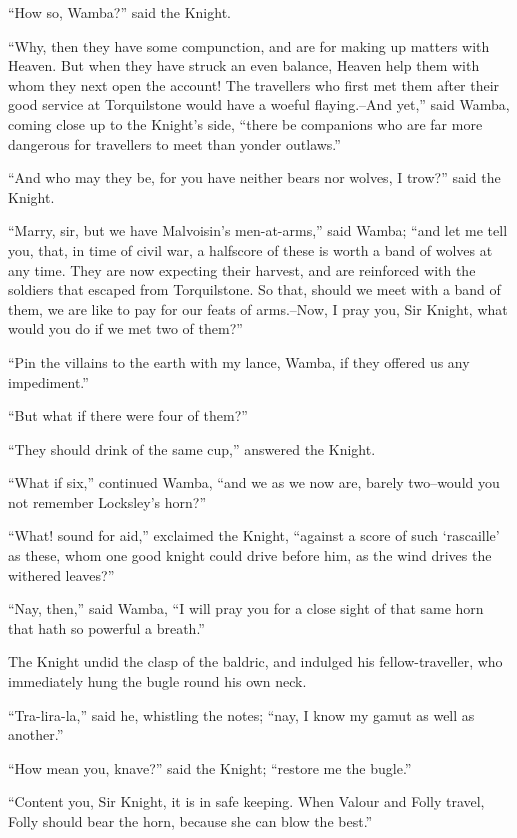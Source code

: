 ``How so, Wamba?'' said the Knight.

``Why, then they have some compunction, and are for making up matters
with Heaven. But when they have struck an even balance, Heaven help them
with whom they next open the account! The travellers who first met them
after their good service at Torquilstone would have a woeful
flaying.--And yet,'' said Wamba, coming close up to the Knight's side,
``there be companions who are far more dangerous for travellers to meet
than yonder outlaws.''

``And who may they be, for you have neither bears nor wolves, I trow?''
said the Knight.

``Marry, sir, but we have Malvoisin's men-at-arms,'' said Wamba; ``and
let me tell you, that, in time of civil war, a halfscore of these is
worth a band of wolves at any time. They are now expecting their
harvest, and are reinforced with the soldiers that escaped from
Torquilstone. So that, should we meet with a band of them, we are like
to pay for our feats of arms.--Now, I pray you, Sir Knight, what would
you do if we met two of them?''

``Pin the villains to the earth with my lance, Wamba, if they offered us
any impediment.''

``But what if there were four of them?''

``They should drink of the same cup,'' answered the Knight.

``What if six,'' continued Wamba, ``and we as we now are, barely
two--would you not remember Locksley's horn?''

``What! sound for aid,'' exclaimed the Knight, ``against a score of such
`rascaille' as these, whom one good knight could drive before him, as
the wind drives the withered leaves?''

``Nay, then,'' said Wamba, ``I will pray you for a close sight of that
same horn that hath so powerful a breath.''

The Knight undid the clasp of the baldric, and indulged his
fellow-traveller, who immediately hung the bugle round his own neck.

``Tra-lira-la,'' said he, whistling the notes; ``nay, I know my gamut as
well as another.''

``How mean you, knave?'' said the Knight; ``restore me the bugle.''

``Content you, Sir Knight, it is in safe keeping. When Valour and Folly
travel, Folly should bear the horn, because she can blow the best.''

